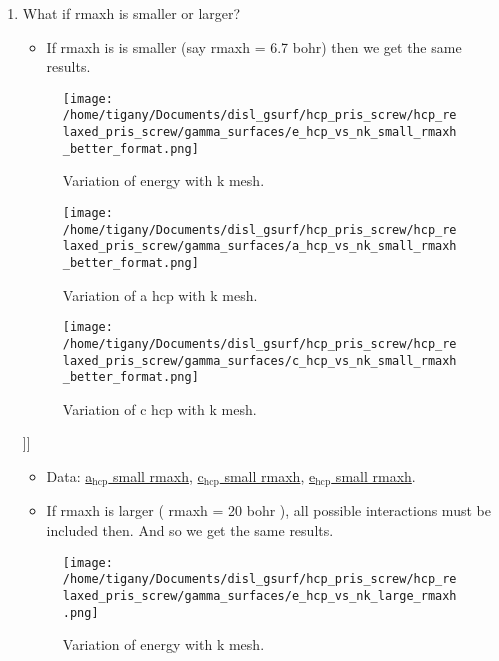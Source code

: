 \documentclass[11pt]{article}
\begin{document}
\begin{enumerate}
\begin{enumerate}
\item What if rmaxh is smaller or larger?
\label{sec-1-2-1-1-1}
\begin{itemize}
\item If rmaxh is is smaller (say rmaxh = 6.7 bohr) then we get the same
results.
\end{itemize}
\begin{figure}[htb]
\centering
\texttt{[image: /home/tigany/Documents/disl\_gsurf/hcp\_pris\_screw/hcp\_relaxed\_pris\_screw/gamma\_surfaces/e\_hcp\_vs\_nk\_small\_rmaxh\_better\_format.png]}
\caption{\label{fig:e_hcp_vs_nk_small_rmaxh.png}Variation of energy with k mesh.}
\end{figure}
\begin{figure}[htb]
\centering
\texttt{[image: /home/tigany/Documents/disl\_gsurf/hcp\_pris\_screw/hcp\_relaxed\_pris\_screw/gamma\_surfaces/a\_hcp\_vs\_nk\_small\_rmaxh\_better\_format.png]}
\caption{\label{fig:e_hcp_vs_nk_small_rmaxh.png}Variation of a hcp with k mesh.}
\end{figure}
\begin{figure}[htb]
\centering
\texttt{[image: /home/tigany/Documents/disl\_gsurf/hcp\_pris\_screw/hcp\_relaxed\_pris\_screw/gamma\_surfaces/c\_hcp\_vs\_nk\_small\_rmaxh\_better\_format.png]}
\caption{\label{fig:e_hcp_vs_nk_small_rmaxh.png}Variation of c hcp with k mesh.}
\end{figure}]]
\begin{itemize}
\item Data: \href{file:///home/tigany/Documents/disl_gsurf/hcp_pris_screw/hcp_relaxed_pris_screw/gamma_surfaces/a_hcp_vs_nk_rmaxh_small.pkl}{a$_{\text{hcp}}$ small rmaxh}, \href{file:///home/tigany/Documents/disl_gsurf/hcp_pris_screw/hcp_relaxed_pris_screw/gamma_surfaces/c_hcp_vs_nk_rmaxh_small.pkl}{c$_{\text{hcp}}$ small rmaxh}, \href{file:///home/tigany/Documents/disl_gsurf/hcp_pris_screw/hcp_relaxed_pris_screw/gamma_surfaces/e_hcp_vs_nk_rmaxh_small.pkl}{e$_{\text{hcp}}$ small rmaxh}.
\item If rmaxh is larger ( rmaxh = 20 bohr ), all possible interactions must
be included then. And so we get the same results.
\end{itemize}
\begin{figure}[htb]
\centering
\texttt{[image: /home/tigany/Documents/disl\_gsurf/hcp\_pris\_screw/hcp\_relaxed\_pris\_screw/gamma\_surfaces/e\_hcp\_vs\_nk\_large\_rmaxh.png]}
\caption{\label{fig:e_hcp_vs_nk_small_rmaxh.png}Variation of energy with k mesh.}

\end{figure}
\end{enumerate}
\end{enumerate}
\end{document}
